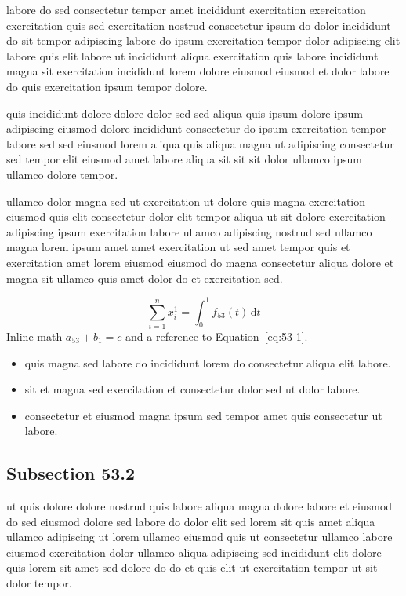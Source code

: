 \documentclass{article}
\begin{document}
labore do sed consectetur tempor amet incididunt exercitation exercitation exercitation quis sed exercitation nostrud consectetur ipsum do dolor incididunt do sit tempor adipiscing labore do ipsum exercitation tempor dolor adipiscing elit labore quis elit labore ut incididunt aliqua exercitation quis labore incididunt magna sit exercitation incididunt lorem dolore eiusmod eiusmod et dolor labore do quis exercitation ipsum tempor dolore.

quis incididunt dolore dolore dolor sed sed aliqua quis ipsum dolore ipsum adipiscing eiusmod dolore incididunt consectetur do ipsum exercitation tempor labore sed sed eiusmod lorem aliqua quis aliqua magna ut adipiscing consectetur sed tempor elit eiusmod amet labore aliqua sit sit sit dolor ullamco ipsum ullamco dolore tempor.

ullamco dolor magna sed ut exercitation ut dolore quis magna exercitation eiusmod quis elit consectetur dolor elit tempor aliqua ut sit dolore exercitation adipiscing ipsum exercitation labore ullamco adipiscing nostrud sed ullamco magna lorem ipsum amet amet exercitation ut sed amet tempor quis et exercitation amet lorem eiusmod eiusmod do magna consectetur aliqua dolore et magna sit ullamco quis amet dolor do et exercitation sed.

\begin{equation}\label{eq:53-1}
  \sum_{i=1}^{n} x_i^{1} = \int_0^1 f_{53}(t)\,\mathrm{d}t
\end{equation}
Inline math $a_{53} + b_{1} = c$ and a reference to Equation~\eqref{eq:53-1}.

\begin{itemize}
  \item quis magna sed labore do incididunt lorem do consectetur aliqua elit labore.
  \item sit et magna sed exercitation et consectetur dolor sed ut dolor labore.
  \item consectetur et eiusmod magna ipsum sed tempor amet quis consectetur ut labore.
\end{itemize}

\subsection{Subsection 53.2}\label{sec:53-2}
ut quis dolore dolore nostrud quis labore aliqua magna dolore labore et eiusmod do sed eiusmod dolore sed labore do dolor elit sed lorem sit quis amet aliqua ullamco adipiscing ut lorem ullamco eiusmod quis ut consectetur ullamco labore eiusmod exercitation dolor ullamco aliqua adipiscing sed incididunt elit dolore quis lorem sit amet sed dolore do do et quis elit ut exercitation tempor ut sit dolor tempor.
\end{document}
